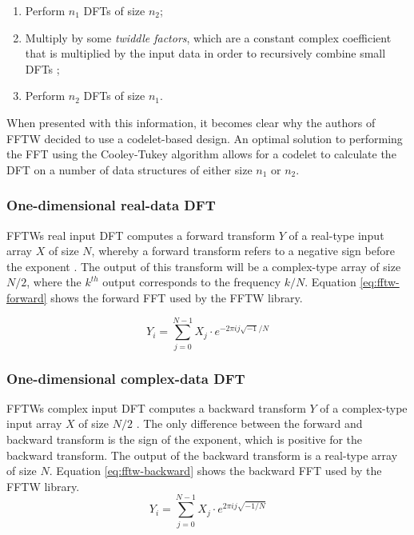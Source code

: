 \documentclass[a4paper,11pt]{report}
\begin{document}
\begin{enumerate}
	\item Perform $n_{1}$ DFTs of size $n_{2}$;
	\item Multiply by some \textit{twiddle factors}, which are a constant complex coefficient that is multiplied by the input data in order to recursively combine small DFTs \cite{gentleman1966fast};
	\item Perform $n_{2}$ DFTs of size $n_{1}$.
\end{enumerate}

When presented with this information, it becomes clear why the authors of FFTW decided to use a codelet-based design. An optimal solution to performing the FFT using the Cooley-Tukey algorithm allows for a codelet to calculate the DFT on a number of data structures of either size $n_{1}$ or $n_{2}$.

\subsubsection{One-dimensional real-data DFT}
FFTWs real input DFT computes a forward transform $Y$ of a real-type input array $X$ of size $N$, whereby a forward transform refers to a negative sign before the exponent \cite{frigo2005design}. The output of this transform will be a complex-type array of size $N/2$, where the $k^{th}$ output corresponds to the frequency $k/N$. Equation \ref{eq:fftw-forward} shows the forward FFT used by the FFTW library.

\begin{equation}
Y _ { i } = \sum _ { j = 0 } ^ { N - 1 } X _ { j } \cdot e ^ { - 2 \pi i j \sqrt { - 1 } / N }
\label{eq:fftw-forward}
\end{equation}

\subsubsection{One-dimensional complex-data DFT}
FFTWs complex input DFT computes a backward transform $Y$ of a complex-type input array $X$ of size $N/2$ \cite{frigo2005design}. The only difference between the forward and backward transform is the sign of the exponent, which is positive for the backward transform. The output of the backward transform is a real-type array of size $N$. Equation \ref{eq:fftw-backward} shows the backward FFT used by the FFTW library.
\begin{equation}
Y _ { i } = \sum _ { j = 0 } ^ { N - 1 } X _ { j } \cdot e ^ { 2 \pi i j \sqrt { - 1 / N } }
\label{eq:fftw-backward}
\end{equation}
\end{document}
